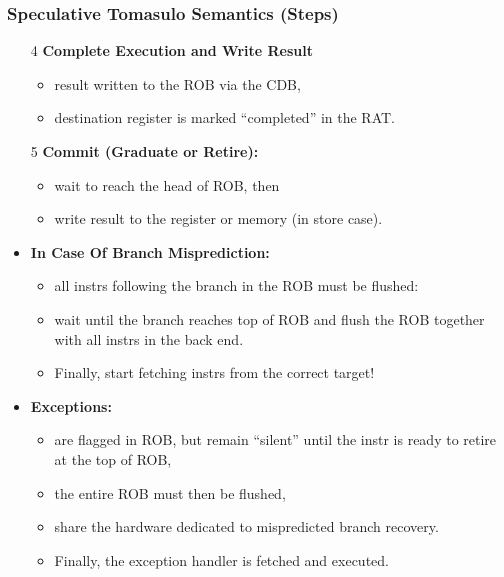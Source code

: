 \documentclass{beamer}
\newcommand{\emp}[1]{\textcolor{DikuRed}{ #1}}
\begin{document}
\begin{frame}[fragile,t]
\frametitle{Speculative Tomasulo Semantics (Steps)}

\begin{itemize}
\item[4] \emp{\bf Complete Execution and Write Result}\smallskip
\begin{itemize}
    \item result written to the ROB via the CDB,
    \item destination register is marked ``completed'' in the RAT.
\end{itemize}\medskip

\item[5] \emp{\bf Commit (Graduate or Retire):}
\begin{itemize}
    \item wait to reach the head of ROB, then 
    \item write result to the register or memory (in store case).
\end{itemize}\bigskip
\medskip

\item \emp{\bf In Case Of Branch Misprediction:}
\begin{itemize}
    \item all instrs following the branch in the ROB must be flushed:
    \item wait until the branch reaches top of ROB and flush the ROB
            together with all instrs in the back end.
    \item Finally, start fetching instrs from the correct target!
\end{itemize}\medskip

\item \emp{\bf Exceptions:}
\begin{itemize}
    \item are flagged in ROB, but remain ``silent'' until the instr
            is ready to retire at the top of ROB, 
    \item the entire ROB must then be flushed,
    \item share the hardware dedicated to mispredicted branch recovery.
    \item Finally, the exception handler is fetched and executed.
\end{itemize}
\end{itemize}

\end{frame}
\end{document}
